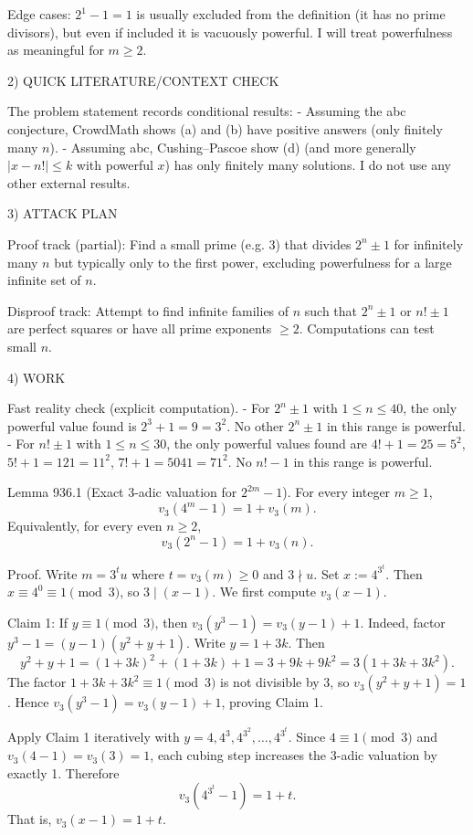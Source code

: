 Edge cases: \(2^1-1=1\) is usually excluded from the definition (it has no prime divisors), but even if included it is vacuously powerful. I will treat powerfulness as meaningful for \(m\ge 2\).

2) QUICK LITERATURE/CONTEXT CHECK

The problem statement records conditional results:
- Assuming the abc conjecture, CrowdMath shows (a) and (b) have positive answers (only finitely many \(n\)).
- Assuming abc, Cushing--Pascoe show (d) (and more generally \(|x-n!|\le k\) with powerful \(x\)) has only finitely many solutions.
I do not use any other external results.

3) ATTACK PLAN

Proof track (partial): Find a small prime (e.g. \(3\)) that divides \(2^n\pm 1\) for infinitely many \(n\) but typically only to the first power, excluding powerfulness for a large infinite set of \(n\).

Disproof track: Attempt to find infinite families of \(n\) such that \(2^n\pm 1\) or \(n!\pm 1\) are perfect squares or have all prime exponents \(\ge2\). Computations can test small \(n\).

4) WORK

Fast reality check (explicit computation).
- For \(2^n\pm 1\) with \(1\le n\le 40\), the only powerful value found is \(2^3+1=9=3^2\). No other \(2^n\pm 1\) in this range is powerful.
- For \(n!\pm 1\) with \(1\le n\le 30\), the only powerful values found are
\(4!+1=25=5^2\), \(5!+1=121=11^2\), \(7!+1=5041=71^2\). No \(n!-1\) in this range is powerful.

Lemma 936.1 (Exact 3-adic valuation for \(2^{2m}-1\)).
For every integer \(m\ge 1\),
\[v_3(4^{m}-1)=1+v_3(m).\]
Equivalently, for every even \(n\ge 2\),
\[v_3(2^{n}-1)=1+v_3(n).\]

Proof.
Write \(m=3^t u\) where \(t=v_3(m)\ge 0\) and \(3\nmid u\).
Set \(x:=4^{3^t}\). Then \(x\equiv 4^{0}\equiv 1\pmod 3\), so \(3\mid (x-1)\).
We first compute \(v_3(x-1)\).

Claim 1: If \(y\equiv 1\pmod 3\), then \(v_3(y^3-1)=v_3(y-1)+1\).
Indeed, factor \(y^3-1=(y-1)(y^2+y+1)\). Write \(y=1+3k\). Then
\[y^2+y+1=(1+3k)^2+(1+3k)+1 = 3 + 9k + 9k^2 = 3(1+3k+3k^2).
\]
The factor \(1+3k+3k^2\equiv 1\pmod 3\) is not divisible by \(3\), so \(v_3(y^2+y+1)=1\). Hence
\(v_3(y^3-1)=v_3(y-1)+1\), proving Claim 1.

Apply Claim 1 iteratively with \(y=4,4^3,4^{3^2},\dots,4^{3^t}\). Since \(4\equiv 1\pmod 3\) and \(v_3(4-1)=v_3(3)=1\), each cubing step increases the 3-adic valuation by exactly 1. Therefore
\[v_3(4^{3^t}-1)=1+t.\]
That is, \(v_3(x-1)=1+t\).

